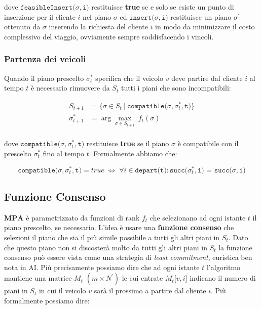 \documentclass[
]{article}
\begin{document}
dove {\(\texttt{feasibleInsert(}\sigma,\texttt{i)}\)} restituisce
\textbf{true} se e solo se esiste un punto di inserzione per il cliente
{\(i\)} nel piano {\(\sigma\)} ed
{\(\texttt{insert(}\sigma,\texttt{i)}\)} restituisce un piano
{\(\sigma^{\prime}\)} ottenuto da {\(\sigma\)} inserendo la richiesta
del cliente {\(i\)} in modo da minimizzare il costo complessivo del
viaggio, ovviamente sempre soddisfacendo i vincoli.

\hypertarget{partenza-dei-veicoli}{%
\subsubsection{Partenza dei veicoli}\label{partenza-dei-veicoli}}

Quando il piano prescelto {\(\sigma_{t}^{\ast}\)} specifica che il
veicolo {\(v\)} deve partire dal cliente {\(i\)} al tempo {\(t\)} è
necessario rimuovere da {\(S_{t}\)} tutti i piani che sono
incompatibili:

\begin{equation*}
    \begin{split}
        S_{t + 1} & {= \{\sigma \in S_{t}\ |\ \texttt{compatible(}\sigma,\sigma_{t}^{\ast},\texttt{t)}\}} \\
\sigma_{t + 1}^{\ast} & {= \arg\max\limits_{\sigma \in S_{t + 1}}\ f_{t}(\sigma)} \\
    \end{split}
\end{equation*}

dove {\(\texttt{compatible(}\sigma,\sigma_{t}^{\ast},\texttt{t)}\)}
restituisce \textbf{true} se il piano {\(\sigma\)} è compatibile con il
prescelto {\(\sigma_{t}^{\ast}\)} fino al tempo {\(t\)}. Formalmente
abbiamo che:

\[\texttt{compatible(}\sigma,\sigma_{t}^{\ast},\texttt{t)} = true\;\Longleftrightarrow\;\forall i \in \texttt{depart(t)}:\texttt{succ(}\sigma_{t}^{\ast},\texttt{i)\ =\ succ(}\sigma,\texttt{i)}\]

\hypertarget{funzione-consenso}{%
\subsection{Funzione Consenso}\label{funzione-consenso}}

{\(\mathbf{MPA}\)} è parametrizzato da funzioni di rank {\(f_{t}\)} che
selezionano ad ogni istante {\(t\)} il piano prescelto, se necessario.
L'idea è usare una \textbf{funzione consenso} che selezioni il piano che
sia il più simile possibile a tutti gli altri piani in {\(S_{t}\)}. Dato che
questo piano non si discosterà molto da tutti gli altri piani in
{\(S_{t}\)} la funzione consenso può essere vista come una strategia di
\emph{least commitment}, euristica ben nota in AI. Più precisamente
possiamo dire che ad ogni istante {\(t\)} l'algoritmo mantiene una
matrice {\(M_{t}\)} {\((m \times N^{\prime})\)} le cui entrate
{\(M_{t}\lbrack v,i\rbrack\)} indicano il numero di piani in {\(S_{t}\)}
in cui il veicolo {\(v\)} sarà il prossimo a partire dal cliente
{\(i\)}. Più formalmente possiamo dire:
\end{document}
